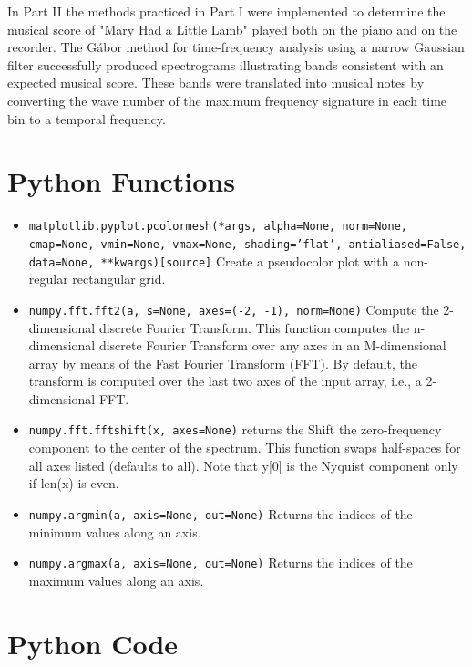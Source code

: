 \documentclass{article}
\begin{document}
In Part II the methods practiced in Part I were implemented to determine the musical score of "Mary Had a Little Lamb" played both on the piano and on the recorder. The G\'abor method for time-frequency analysis using a narrow Gaussian filter successfully produced spectrograms illustrating bands consistent with an expected musical score. These bands were translated into musical notes by converting the wave number of the maximum frequency signature in each time bin to a temporal frequency.

\printbibliography

\begin{appendices}

\section{Python Functions}
\begin{itemize}
    \item \texttt{matplotlib.pyplot.pcolormesh(*args, alpha=None, norm=None, cmap=None, vmin=None, vmax=None, shading='flat', antialiased=False, data=None, **kwargs)[source]} Create a pseudocolor plot with a non-regular rectangular grid.
    \item \texttt{numpy.fft.fft2(a, s=None, axes=(-2, -1), norm=None)} Compute the 2-dimensional discrete Fourier Transform.
    This function computes the n-dimensional discrete Fourier Transform over any axes in an M-dimensional array by means of the Fast Fourier Transform (FFT). By default, the transform is computed over the last two axes of the input array, i.e., a 2-dimensional FFT.
    \item \texttt{numpy.fft.fftshift(x, axes=None)} returns the Shift the zero-frequency component to the center of the spectrum.
    This function swaps half-spaces for all axes listed (defaults to all). Note that y[0] is the Nyquist component only if len(x) is even.
    \item \texttt{numpy.argmin(a, axis=None, out=None)} Returns the indices of the minimum values along an axis.
    \item \texttt{numpy.argmax(a, axis=None, out=None)} Returns the indices of the maximum values along an axis.
    
\label{itemize:functions}
\end{itemize}

\section{Python Code}
\inputminted{python}{HW2_DanielBurnham_files/HW2_DanielBurnham_final}
\label{appendix:code}

\end{appendices}
\end{document}
